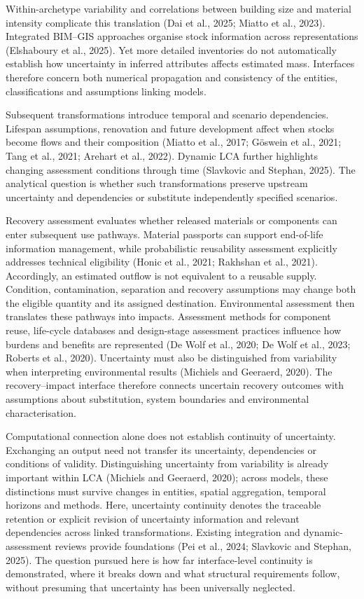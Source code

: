 Within-archetype variability and correlations between building size and material intensity complicate this translation (Dai et al., 2025; Miatto et al., 2023). Integrated BIM--GIS approaches organise stock information across representations (Elshaboury et al., 2025). Yet more detailed inventories do not automatically establish how uncertainty in inferred attributes affects estimated mass. Interfaces therefore concern both numerical propagation and consistency of the entities, classifications and assumptions linking models.

Subsequent transformations introduce temporal and scenario dependencies. Lifespan assumptions, renovation and future development affect when stocks become flows and their composition (Miatto et al., 2017; Göswein et al., 2021; Tang et al., 2021; Arehart et al., 2022). Dynamic LCA further highlights changing assessment conditions through time (Slavkovic and Stephan, 2025). The analytical question is whether such transformations preserve upstream uncertainty and dependencies or substitute independently specified scenarios.

Recovery assessment evaluates whether released materials or components can enter subsequent use pathways. Material passports can support end-of-life information management, while probabilistic reusability assessment explicitly addresses technical eligibility (Honic et al., 2021; Rakhshan et al., 2021). Accordingly, an estimated outflow is not equivalent to a reusable supply. Condition, contamination, separation and recovery assumptions may change both the eligible quantity and its assigned destination. Environmental assessment then translates these pathways into impacts. Assessment methods for component reuse, life-cycle databases and design-stage assessment practices influence how burdens and benefits are represented (De Wolf et al., 2020; De Wolf et al., 2023; Roberts et al., 2020). Uncertainty must also be distinguished from variability when interpreting environmental results (Michiels and Geeraerd, 2020). The recovery--impact interface therefore connects uncertain recovery outcomes with assumptions about substitution, system boundaries and environmental characterisation.

Computational connection alone does not establish continuity of uncertainty. Exchanging an output need not transfer its uncertainty, dependencies or conditions of validity. Distinguishing uncertainty from variability is already important within LCA (Michiels and Geeraerd, 2020); across models, these distinctions must survive changes in entities, spatial aggregation, temporal horizons and methods. Here, uncertainty continuity denotes the traceable retention or explicit revision of uncertainty information and relevant dependencies across linked transformations. Existing integration and dynamic-assessment reviews provide foundations (Pei et al., 2024; Slavkovic and Stephan, 2025). The question pursued here is how far interface-level continuity is demonstrated, where it breaks down and what structural requirements follow, without presuming that uncertainty has been universally neglected.

